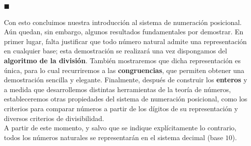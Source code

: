 \documentclass[10 pt]{article}
\begin{document}
\begin{flushright}
$\blacksquare$
\end{flushright}

\Large{Con esto concluimos nuestra introducción al sistema de numeración posicional. Aún quedan, sin embargo, algunos resultados fundamentales por demostrar. En primer lugar, falta justificar que todo número natural admite una representación en cualquier base; esta demostración se realizará una vez dispongamos del \textbf{algoritmo de la división}. También mostraremos que dicha representación es única, para lo cual recurriremos a las \textbf{congruencias}, que permiten obtener una demostración sencilla y elegante. Finalmente, después de construir los \textbf{enteros} y a medida que desarrollemos distintas herramientas de la teoría de números, estableceremos otras propiedades del sistema de numeración posicional, como los criterios para comparar números a partir de los dígitos de su representación y diversos criterios de divisibilidad.} \\


\Large{A partir de este momento, y salvo que se indique explícitamente lo contrario, todos los números naturales se representarán en el sistema decimal (base $10$).} \\
\end{document}
